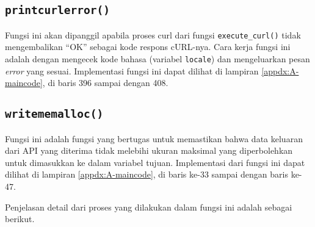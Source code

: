\subsection{\texttt{print\textunderscore curl\textunderscore error()}}
\label{sec:testing-implementation-curl-error}

Fungsi ini akan dipanggil apabila proses curl dari fungsi \verb|execute_curl()| tidak mengembalikan ``OK'' sebagai kode respons cURL-nya. Cara kerja fungsi ini adalah dengan mengecek kode bahasa (variabel \verb|locale|) dan mengeluarkan pesan \textit{error} yang sesuai. Implementasi fungsi ini dapat dilihat di lampiran \ref{appdx:A-maincode}, di baris 396 sampai dengan 408.
	
\subsection{\texttt{write\textunderscore memalloc()}}
\label{sec:testing-implementation-write-memalloc}

Fungsi ini adalah fungsi yang bertugas untuk memastikan bahwa data keluaran dari API yang diterima tidak melebihi ukuran maksimal yang diperbolehkan untuk dimasukkan ke dalam variabel tujuan. Implementasi dari fungsi ini dapat dilihat di lampiran \ref{appdx:A-maincode}, di baris ke-33 sampai dengan baris ke-47.

Penjelasan detail dari proses yang dilakukan dalam fungsi ini adalah sebagai berikut.


